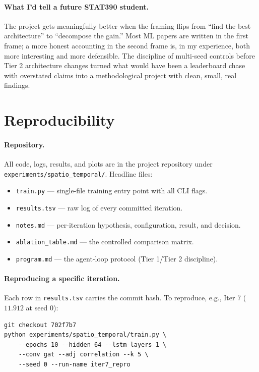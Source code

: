 \documentclass{article}
\begin{document}
\paragraph{What I'd tell a future STAT390 student.}
The project gets meaningfully better when the framing flips from ``find the best architecture'' to ``decompose the gain.'' Most ML papers are written in the first frame; a more honest accounting in the second frame is, in my experience, both more interesting and more defensible. The discipline of multi-seed controls before Tier 2 architecture changes turned what would have been a leaderboard chase with overstated claims into a methodological project with clean, small, real findings.

\section{Reproducibility}
\label{app:repro}

\paragraph{Repository.}
All code, logs, results, and plots are in the project repository under \texttt{experiments/spatio\_temporal/}. Headline files:
\begin{itemize}[itemsep=0pt,topsep=2pt]
    \item \texttt{train.py} --- single-file training entry point with all CLI flags.
    \item \texttt{results.tsv} --- raw log of every committed iteration.
    \item \texttt{notes.md} --- per-iteration hypothesis, configuration, result, and decision.
    \item \texttt{ablation\_table.md} --- the controlled comparison matrix.
    \item \texttt{program.md} --- the agent-loop protocol (Tier 1/Tier 2 discipline).
\end{itemize}

\paragraph{Reproducing a specific iteration.}
Each row in \texttt{results.tsv} carries the commit hash. To reproduce, e.g., Iter 7 ($11.912$ at seed $0$):
\begin{verbatim}
git checkout 702f7b7
python experiments/spatio_temporal/train.py \
    --epochs 10 --hidden 64 --lstm-layers 1 \
    --conv gat --adj correlation --k 5 \
    --seed 0 --run-name iter7_repro
\end{verbatim}
\end{document}
